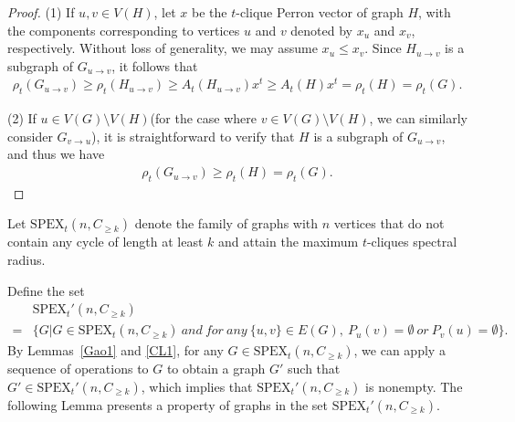 \documentclass[preprint,12pt]{elsarticle}
\begin{document}
\begin{proof}
                (1) If $u, v \in V(H)$, let $x$ be the $t$-clique Perron vector of graph $H$, with the components corresponding to vertices $u$ and $v$ denoted by $x_u$ and $x_v$, respectively. Without loss of generality, we may assume $x_u \leq x_v$. Since $H_{u \to v}$ is a subgraph of $G_{u \to v}$, it follows that
                    \begin{align*}
                         \rho_t(G_{u \to v}) \geq \rho_t(H_{u \to v}) \geq {A_t(H_{u \to v})x^t} \geq {A_t(H)x^t} = \rho_t(H)= \rho_t(G).
			        \end{align*}

                (2) If $u \in V(G) \setminus V(H)$(for the case where $v  \in V(G) \setminus V(H)$, we can similarly consider $G_{v \to u}$), it is straightforward to verify that $H$ is a subgraph of $G_{u \to v}$, and thus we have
                    \begin{align*}
                         \rho_t(G_{u \to v}) \geq \rho_t(H) = \rho_t(G).
			        \end{align*}


        \end{proof}


        Let $\mathrm{SPEX}_t(n,C_{\geq k})$ denote the family of graphs with $n$ vertices that do not contain any cycle of length at least $k$ and attain the maximum $t$-cliques spectral radius.

        Define the set
            \begin{align*}
                &\mathrm{SPEX}_t'(n,C_{\geq k})\\=&\{G|G \in \mathrm{SPEX}_t(n,C_{\geq k})\ and\ for \ any\ \{u,v\} \in E(G),\ P_u(v)=\emptyset\ or\ P_v(u)=\emptyset\}.
            \end{align*}
       By Lemmas~\ref{Gao1} and \ref{CL1}, for any $G \in \mathrm{SPEX}_t(n, C_{\geq k})$, we can apply a sequence of operations to $G$ to obtain a graph $G'$ such that $G' \in \mathrm{SPEX}_t'(n, C_{\geq k})$, which implies that $\mathrm{SPEX}_t'(n, C_{\geq k})$ is nonempty. The following Lemma presents a property of graphs in the set $\mathrm{SPEX}_t'(n,C_{\geq k})$.
\end{document}
